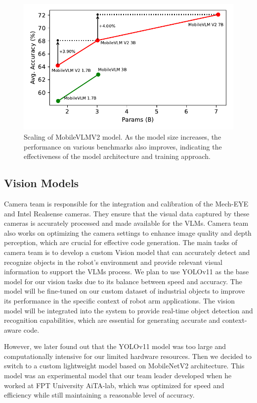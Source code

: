 \documentclass[conference]{IEEEtran}
\begin{document}
\begin{figure}[ht]
  \centering
   \includegraphics[width=.87\columnwidth]{figures/mobilevlm_scaling.pdf}
   \caption{Scaling of MobileVLMV2 model. As the model size increases, the performance on various benchmarks also improves, indicating the effectiveness of the model architecture and training approach.}
   \label{fig:model-scaling}
\end{figure}

\newpage

\subsection{Vision Models}

Camera team is responsible for the integration and calibration of the Mech-EYE and Intel Realsense cameras. 
They ensure that the visual data captured by these cameras is accurately processed and made available for the VLMs.
Camera team also works on optimizing the camera settings to enhance image quality and depth perception, which are crucial for effective code generation.
The main tasks of camera team is to develop a custom Vision model that can accurately detect and recognize objects in the robot's environment and provide relevant visual information to support the VLMs process.
We plan to use YOLOv11\cite{yolo11_ultralytics} as the base model for our vision tasks due to its balance between speed and accuracy. The model will be fine-tuned on our custom dataset of industrial objects to improve its performance in the specific context of robot arm applications.
The vision model will be integrated into the system to provide real-time object detection and recognition capabilities, which are essential for generating accurate and context-aware code.

However, we later found out that the YOLOv11 model was too large and computationally intensive for our limited hardware resources. Then we decided to switch to a custom lightweight model based on MobileNetV2\cite{sandler2018mobilenetv2} architecture.
This model was an experimental model that our team leader developed when he worked at FPT University AiTA-lab\cite{aita_lab}, which was optimized for speed and efficiency while still maintaining a reasonable level of accuracy.
\end{document}
